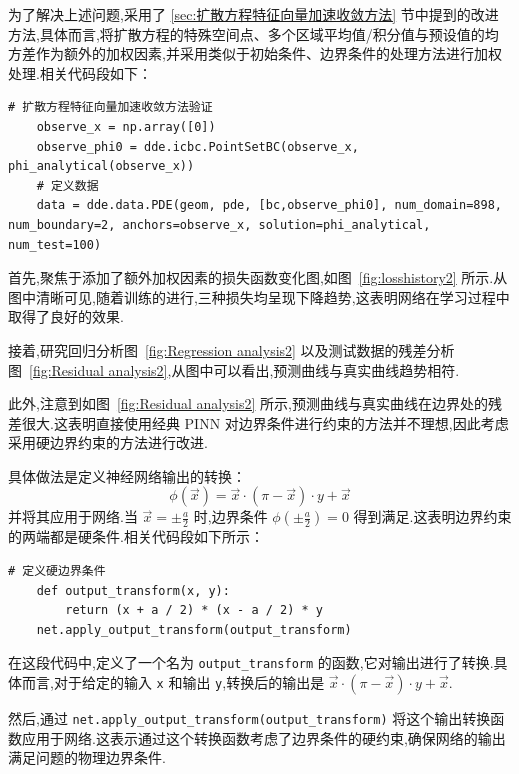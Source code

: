 \documentclass{Sichuan Normal University}
\begin{document}
    为了解决上述问题,采用了 \ref{sec:扩散方程特征向量加速收敛方法} 节中提到的改进方法,具体而言,将扩散方程的特殊空间点、多个区域平均值/积分值与预设值的均方差作为额外的加权因素,并采用类似于初始条件、边界条件的处理方法进行加权处理.相关代码段如下：
\begin{lstlisting}[style=python,basicstyle=\footnotesize\fontspec{Courier New},]  
    # 扩散方程特征向量加速收敛方法验证
    observe_x = np.array([0])
    observe_phi0 = dde.icbc.PointSetBC(observe_x, phi_analytical(observe_x))
    # 定义数据
    data = dde.data.PDE(geom, pde, [bc,observe_phi0], num_domain=898, num_boundary=2, anchors=observe_x, solution=phi_analytical, num_test=100)
\end{lstlisting}
首先,聚焦于添加了额外加权因素的损失函数变化图,如图~\ref{fig:losshistory2} 所示.从图中清晰可见,随着训练的进行,三种损失均呈现下降趋势,这表明网络在学习过程中取得了良好的效果.

接着,研究回归分析图~\ref{fig:Regression analysis2} 以及测试数据的残差分析图~\ref{fig:Residual analysis2},从图中可以看出,预测曲线与真实曲线趋势相符.

此外,注意到如图~\ref{fig:Residual analysis2} 所示,预测曲线与真实曲线在边界处的残差很大.这表明直接使用经典 PINN 对边界条件进行约束的方法并不理想,因此考虑采用硬边界约束的方法进行改进.

具体做法是定义神经网络输出的转换：
\begin{equation}
    \phi(\vec{x})=\vec{x} \cdot(\pi-\vec{x}) \cdot y+\vec{x}
\end{equation}
并将其应用于网络.当 $\vec{x}=\pm \frac{a}{2}$ 时,边界条件 $\phi(\pm \frac{a}{2})=0$ 得到满足.这表明边界约束的两端都是硬条件.相关代码段如下所示：

\begin{lstlisting}[style=python,basicstyle=\footnotesize\fontspec{Courier New},]  
    # 定义硬边界条件
    def output_transform(x, y):
        return (x + a / 2) * (x - a / 2) * y
    net.apply_output_transform(output_transform)
\end{lstlisting}

在这段代码中,定义了一个名为 \texttt{output\_transform} 的函数,它对输出进行了转换.具体而言,对于给定的输入 \texttt{x} 和输出 \texttt{y},转换后的输出是 $\vec{x} \cdot (\pi - \vec{x}) \cdot y + \vec{x}$.

然后,通过 \texttt{net.apply\_output\_transform(output\_transform)} 将这个输出转换函数应用于网络.这表示通过这个转换函数考虑了边界条件的硬约束,确保网络的输出满足问题的物理边界条件.
\end{document}
